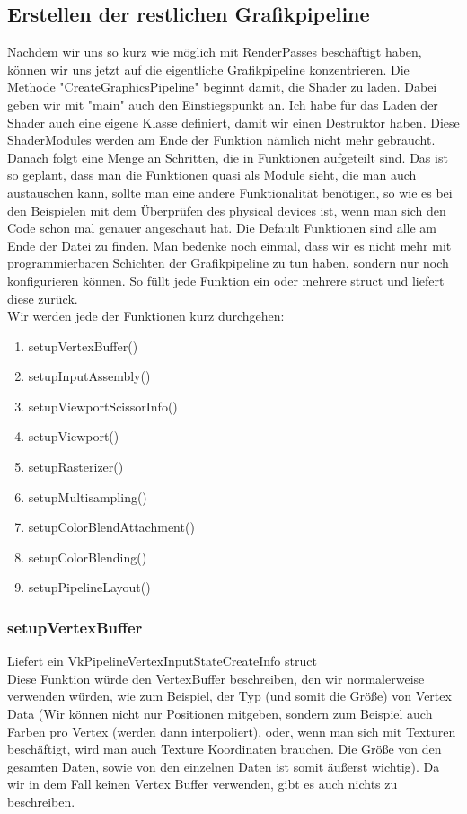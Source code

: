 \documentclass[11pt,a4paper]{report}
\begin{document}
\subsection{Erstellen der restlichen Grafikpipeline}
Nachdem wir uns so kurz wie möglich mit RenderPasses beschäftigt haben, können wir uns jetzt auf die eigentliche Grafikpipeline konzentrieren. Die Methode "CreateGraphicsPipeline" beginnt damit, die Shader zu laden. Dabei geben wir mit "main" auch den Einstiegspunkt an. Ich habe für das Laden der Shader auch eine eigene Klasse definiert, damit wir einen Destruktor haben. Diese ShaderModules werden am Ende der Funktion nämlich nicht mehr gebraucht. Danach folgt eine Menge an Schritten, die in Funktionen aufgeteilt sind. Das ist so geplant, dass man die Funktionen quasi als Module sieht, die man auch austauschen kann, sollte man eine andere Funktionalität benötigen, so wie es bei den Beispielen mit dem Überprüfen des physical devices ist, wenn man sich den Code schon mal genauer angeschaut hat. Die Default Funktionen sind alle am Ende der Datei zu finden. Man bedenke noch einmal, dass wir es nicht mehr mit programmierbaren Schichten der Grafikpipeline zu tun haben, sondern nur noch konfigurieren können. So füllt jede Funktion ein oder mehrere struct und liefert diese zurück.\\
Wir werden jede der Funktionen kurz durchgehen:
\begin{enumerate}
	\item setupVertexBuffer()
	\item setupInputAssembly()
	\item setupViewportScissorInfo()
	\item setupViewport()
	\item setupRasterizer()
	\item setupMultisampling()
	\item setupColorBlendAttachment()
	\item setupColorBlending()
	\item setupPipelineLayout()
\end{enumerate}

\subsubsection{setupVertexBuffer}
Liefert ein VkPipelineVertexInputStateCreateInfo struct\\
Diese Funktion würde den VertexBuffer beschreiben, den wir normalerweise verwenden würden, wie zum Beispiel, der Typ (und somit die Größe) von Vertex Data (Wir können nicht nur Positionen mitgeben, sondern zum Beispiel auch Farben pro Vertex (werden dann interpoliert), oder, wenn man sich mit Texturen beschäftigt, wird man auch Texture Koordinaten brauchen. Die Größe von den gesamten Daten, sowie von den einzelnen Daten ist somit äußerst wichtig). Da wir in dem Fall keinen Vertex Buffer verwenden, gibt es auch nichts zu beschreiben.
\end{document}
